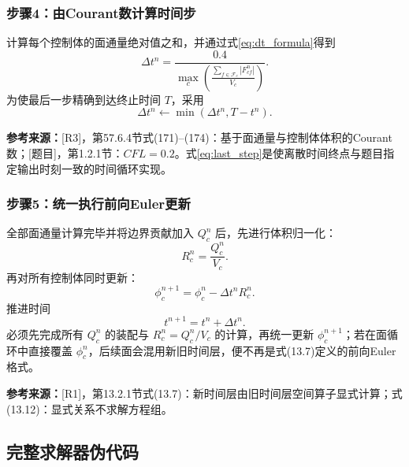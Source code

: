\documentclass[UTF8,12pt,a4paper]{ctexart}
\numberwithin{equation}{section}
\newcommand{\Rone}{\textnormal{[R1]}}
\newcommand{\Rthree}{\textnormal{[R3]}}
\newcommand{\Task}{\textnormal{[题目]}}
\newcommand{\source}[1]{%
  \par\smallskip
  \noindent\colorbox{sourcebg}{%
    \parbox{0.955\linewidth}{\footnotesize\color{sourcegray}\textbf{参考来源：}#1}%
  }
  \par\smallskip
}
\begin{document}
\subsubsection*{步骤4：由Courant数计算时间步}

计算每个控制体的面通量绝对值之和，并通过式\eqref{eq:dt_formula}得到
\begin{equation}
  \Delta t^n
  =\frac{0.4}{
    \displaystyle
    \max_c\left(
      \frac{\sum_{f\in\mathcal F_c}|F_{cf}^n|}{V_c}
    \right)}.
  \label{eq:solver_dt}
\end{equation}
为使最后一步精确到达终止时间 $T$，采用
\begin{equation}
  \Delta t^n
  \leftarrow
  \min(\Delta t^n,T-t^n).
  \label{eq:last_step}
\end{equation}

\source{\Rthree，第57.6.4节式(171)--(174)：基于面通量与控制体体积的Courant数；\Task，第1.2.1节：$CFL=0.2$。式\eqref{eq:last_step}是使离散时间终点与题目指定输出时刻一致的时间循环实现。}

\subsubsection*{步骤5：统一执行前向Euler更新}

全部面通量计算完毕并将边界贡献加入 $Q_c^n$ 后，先进行体积归一化：
\begin{equation}
  \boxed{R_c^n=\frac{Q_c^n}{V_c}}.
  \label{eq:solver_normalize}
\end{equation}
再对所有控制体同时更新：
\begin{equation}
  \boxed{
  \phi_c^{n+1}
  =\phi_c^n-\Delta t^n R_c^n
  }.
  \label{eq:solver_update}
\end{equation}
推进时间
\begin{equation}
  t^{n+1}=t^n+\Delta t^n.
  \label{eq:advance_time}
\end{equation}
必须先完成所有 $Q_c^n$ 的装配与 $R_c^n=Q_c^n/V_c$ 的计算，再统一更新 $\phi_c^{n+1}$；若在面循环中直接覆盖 $\phi_c^n$，后续面会混用新旧时间层，便不再是式(13.7)定义的前向Euler格式。

\source{\Rone，第13.2.1节式(13.7)：新时间层由旧时间层空间算子显式计算；式(13.12)：显式关系不求解方程组。}

\subsection{完整求解器伪代码}
\end{document}
